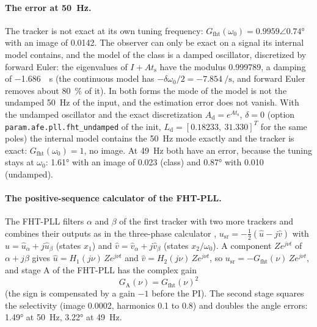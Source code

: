 \documentclass[11pt,a4paper]{scrartcl}
\newcommand{\ped}[1]{_{\mathrm{#1}}}
\newcommand{\code}[1]{\texttt{#1}}
\begin{document}
\begin{onehalfspace}
\paragraph{The error at \SI{50}{\hertz}.} The tracker is not exact at its own tuning frequency: $G\ped{fht}(\omega_0) = 0.9959\angle\ang{0.74}$ with an image of \num{0.0142}. The observer can only be exact on a signal its internal model contains, and the model of the class is a damped oscillator, discretized by forward Euler: the eigenvalues of $I + A t\ped{s}$ have the modulus \num{0.999789}, a damping of \SI{-1.686}{\per\second} (the continuous model has $-\delta\omega_0/2 = \SI{-7.854}{\per\second}$, and forward Euler removes about \num{80}~\% of it). In both forms the mode of the model is not the undamped \SI{50}{\hertz} of the input, and the estimation error does not vanish. With the undamped oscillator and the exact discretization $A\ped{d} = e^{A t\ped{s}}$, $\delta = 0$ (option \code{param.afe.pll.fht\_undamped} of the init, $L\ped{d} = [0.18233,\ 31.330]^T$ for the same poles) the internal model contains the \SI{50}{\hertz} mode exactly and the tracker is exact: $G\ped{fht}(\omega_0) = 1$, no image. At \SI{49}{\hertz} both have an error, because the tuning stays at $\omega_0$: \ang{1.61} with an image of \num{0.023} (class) and \ang{0.87} with \num{0.010} (undamped).

\paragraph{The positive-sequence calculator of the FHT-PLL.} The FHT-PLL filters $\alpha$ and $\beta$ of the first tracker with two more trackers and combines their outputs as in the three-phase calculator \cite{note_3ph}, $u\ped{sr} = -\tfrac12(\hat u - j\hat v)$ with $\hat u = \hat u_\alpha + j\hat u_\beta$ (states $x_1$) and $\hat v = \hat v_\alpha + j\hat v_\beta$ (states $x_2/\omega_0$). A component $Z e^{j\nu t}$ of $\alpha + j\beta$ gives $\hat u = H_1(j\nu)\,Z e^{j\nu t}$ and $\hat v = H_2(j\nu)\,Z e^{j\nu t}$, so $u\ped{sr} = -G\ped{fht}(\nu)\,Z e^{j\nu t}$, and stage A of the FHT-PLL has the complex gain
\begin{equation}
	G\ped{A}(\nu) = G\ped{fht}(\nu)^2
	\label{eq:GA}
\end{equation}
(the sign is compensated by a gain $-1$ before the PI). The second stage squares the selectivity (image \num{0.0002}, harmonics \num{0.1} to \num{0.8}) and doubles the angle errors: \ang{1.49} at \SI{50}{\hertz}, \ang{3.22} at \SI{49}{\hertz}.


\end{onehalfspace}
\end{document}
